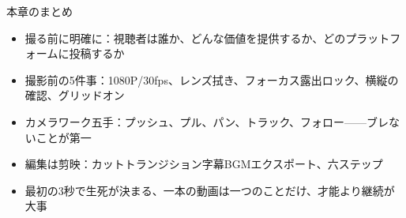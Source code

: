 \begin{tcbsummary}{本章のまとめ}
\begin{itemize}
  \item 撮る前に明確に：視聴者は誰か、どんな価値を提供するか、どのプラットフォームに投稿するか
  \item 撮影前の5件事：1080P/30fps、レンズ拭き、フォーカス露出ロック、横縦の確認、グリッドオン
  \item カメラワーク五手：プッシュ、プル、パン、トラック、フォロー——ブレないことが第一
  \item 編集は剪映：カットトランジション字幕BGMエクスポート、六ステップ
  \item 最初の3秒で生死が決まる、一本の動画は一つのことだけ、才能より継続が大事
\end{itemize}

\end{tcbsummary}

